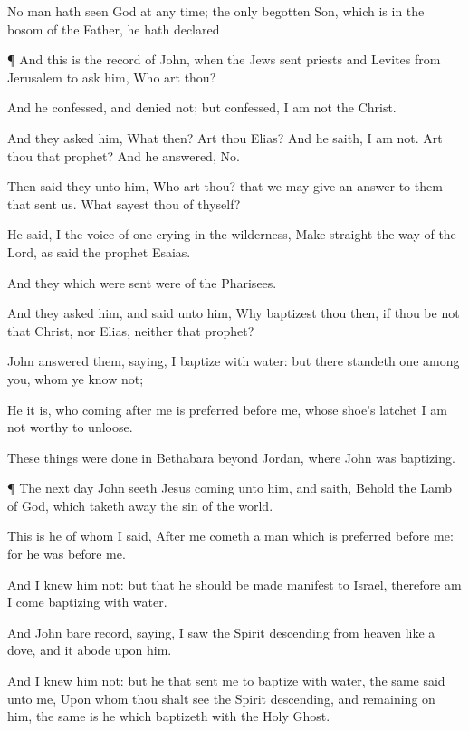 {No
man hath
seen
God at any
time; the only
begotten
Son,
which
is
in the
bosom of the
Father,
he hath
declared
{}


\par }{\PP {}¶
And
this
is the
record of
John,
when the
Jews
sent
priests
and
Levites
from
Jerusalem
to
ask
him,
Who
art
thou?

And he
confessed,
and
denied
not;
but
confessed,
I
am
not the
Christ.

And they
asked
him,
What
then?
Art
thou
Elias?
And he
saith, I
am
not.
Art
thou that
prophet?
And he
answered,
No.

Then said
they unto
him,
Who art
thou?
that we may
give an
answer to
them that
sent
us.
What sayest
thou
of
thyself?

He
said,
I
{} the
voice of one
crying
in the
wilderness, Make
straight the
way of the
Lord,
as
said the
prophet
Esaias.

And
they which were
sent
were
of the
Pharisees.

And they
asked
him,
and
said unto
him,
Why baptizest
thou
then,
if
thou
be
not that
Christ,
nor
Elias,
neither that
prophet?

John
answered
them,
saying,
I
baptize
with
water:
but there
standeth one
among
you,
whom
ye
know
not;

He it
is,
who
coming
after
me is
preferred
before
me,
whose
shoe’s
latchet
I
am
not
worthy to
unloose.

These
things were
done
in
Bethabara
beyond
Jordan,
where
John
was
baptizing.


\par }{\PP {}¶ The next
day
John
seeth
Jesus
coming
unto
him,
and
saith,
Behold the
Lamb of
God,
which taketh
away the
sin of the
world.

This
is he
of
whom
I
said,
After
me
cometh a
man
which is
preferred
before
me:
for he
was
before
me.

And
I
knew
him
not:
but
that he should be made
manifest to
Israel,
therefore
am
I
come
baptizing
with
water.

And
John bare
record,
saying, I
saw the
Spirit
descending
from
heaven
like a
dove,
and it
abode
upon
him.

And I
knew
him
not:
but
he that
sent
me to
baptize
with
water, the
same
said unto
me,
Upon
whom thou shalt
see the
Spirit
descending,
and
remaining
on
him, the
same
is
he which
baptizeth
with
the
Holy
Ghost.

}
